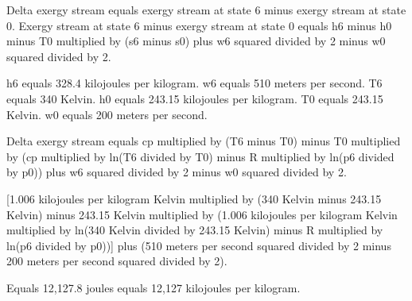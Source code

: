 Delta exergy stream equals exergy stream at state 6 minus exergy stream at state 0.  
Exergy stream at state 6 minus exergy stream at state 0 equals h6 minus h0 minus T0 multiplied by (s6 minus s0) plus w6 squared divided by 2 minus w0 squared divided by 2.  

h6 equals 328.4 kilojoules per kilogram.  
w6 equals 510 meters per second.  
T6 equals 340 Kelvin.  
h0 equals 243.15 kilojoules per kilogram.  
T0 equals 243.15 Kelvin.  
w0 equals 200 meters per second.  

Delta exergy stream equals cp multiplied by (T6 minus T0) minus T0 multiplied by (cp multiplied by ln(T6 divided by T0) minus R multiplied by ln(p6 divided by p0)) plus w6 squared divided by 2 minus w0 squared divided by 2.  

[1.006 kilojoules per kilogram Kelvin multiplied by (340 Kelvin minus 243.15 Kelvin) minus 243.15 Kelvin multiplied by (1.006 kilojoules per kilogram Kelvin multiplied by ln(340 Kelvin divided by 243.15 Kelvin) minus R multiplied by ln(p6 divided by p0))] plus (510 meters per second squared divided by 2 minus 200 meters per second squared divided by 2).  

Equals 12,127.8 joules equals 12,127 kilojoules per kilogram.